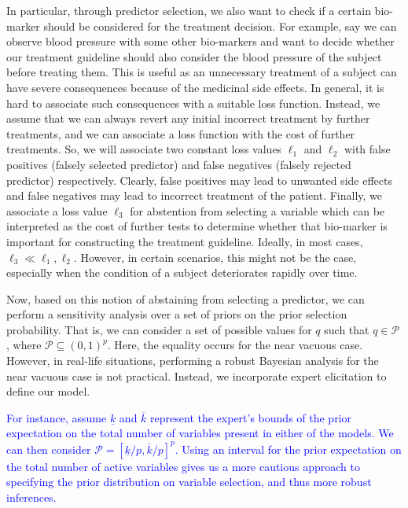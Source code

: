 \documentclass[preprint,12pt]{elsarticle}
\newcommand{\added}[1]{\textcolor{blue}{#1}}
\begin{document}
In particular, through predictor selection, we also want 
to check if a certain bio-marker should be considered
for the treatment decision. For example, say we can observe blood pressure with some
other bio-markers and want to decide whether our
treatment guideline should also consider the blood
pressure of the subject before treating them. This is
useful as an unnecessary treatment of a subject can have severe consequences because of the medicinal
side effects. In general, it is hard to associate such consequences 
with a suitable loss function. Instead, we
assume that we can always revert any initial incorrect treatment by further treatments, 
and we can associate a loss function with the cost of further treatments.
So, we will associate two constant loss values $\ell_1$ and $\ell_2$ 
with false positives (falsely selected predictor) and 
false negatives (falsely rejected predictor) respectively. 
Clearly, false positives may lead to unwanted side effects and
false negatives may lead to incorrect treatment of the patient. Finally, we associate
a loss value $\ell_3$ for abstention from selecting
a variable which can be interpreted as the cost of further tests to determine whether that bio-marker
is important for constructing the treatment guideline.
Ideally, in most cases, $\ell_3\ll \ell_1,\ell_2$. However, in certain scenarios,
this might not be the case, especially when the condition of a subject deteriorates rapidly
over time.

Now, based on this notion of abstaining from selecting a predictor, we can perform
a sensitivity analysis over a set of priors on the prior selection probability.
That is, we can consider a set of possible values for $q$ such that
$q\in\mathcal{P}$, where $\mathcal{P} \subseteq \left(0, 1\right)^{p}$.
Here, the equality occurs for the near vacuous case. However, in real-life
situations, performing a robust Bayesian analysis for the near vacuous case is 
not practical. Instead, we incorporate expert elicitation to define our model.

\added{%
For instance, assume $\underline{k}$ and $\overline{k}$ represent the expert's bounds of the prior expectation on the
total number of variables present in either of the models. We can then consider $\mathcal{P}=\left[\underline{k}/p, \overline{k}/p\right]^p$.
Using an interval for the prior expectation on the total number of active variables
gives us a more cautious approach to specifying the prior distribution on variable selection,
and thus more robust inferences.%
}
\end{document}
